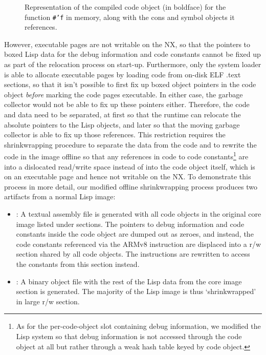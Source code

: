 \documentclass[format=sigconf]{acmart}
\begin{document}
\begin{figure}[h]
  \label{fig:before-shrinkwrap}
  \centering
  
  \caption{Representation of the compiled code object (in boldface)
    for the function \protect\texttt{\#'f} in memory, along with the
    cons and symbol objects it references.}
\end{figure}

However, executable pages are not writable on the NX, so that the pointers to boxed Lisp data for the debug information and code constants cannot be fixed up as part of the relocation process on start-up. Furthermore, only the system loader is able to allocate executable pages by loading code from on-disk ELF .text sections, so that it isn't possible to first fix up boxed object pointers in the code object \emph{before} marking the code pages executable. In either case, the garbage collector would not be able to fix up these pointers either. Therefore, the code and data need to be separated, at first so that the runtime can relocate the absolute pointers to the Lisp objects, and later so that the moving garbage collector is able to fix up those references. This restriction requires the shrinkwrapping procedure to separate the data from the code and to rewrite the code in the image offline so that any references in code to code constants\footnote{As for the per-code-object slot containing debug information, we modified the Lisp system so that debug information is not accessed through the code object at all but rather through a weak hash table keyed by code object.} are into a dislocated read/write space instead of into the code object itself, which is on an executable page and hence not writable on the NX. To demonstrate this process in more detail, our modified offline shrinkwrapping process produces two artifacts from a normal Lisp image:

\begin{itemize}
\item {}: A textual assembly file is generated with all code objects in the original core image listed under  sections. The pointers to debug information and code constants inside the code object are dumped out as zeroes, and instead, the code constants referenced via the ARMv8  instruction are displaced into a r/w  section shared by all code objects. The  instructions are rewritten to access the constants from this section instead.
\item {}: A binary object file with the rest of the Lisp data from the core image section is generated. The majority of the Lisp image is thus `shrinkwrapped' in large r/w  section.
\end{itemize}
\end{document}
